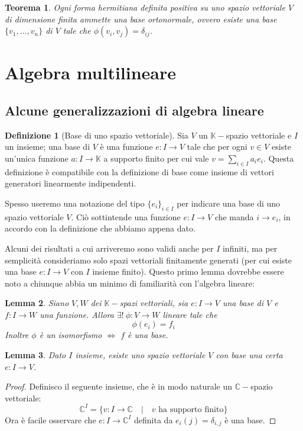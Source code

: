 \documentclass[11pt]{article}
\theoremstyle{plain}
\newtheorem{thm}{Teorema}[section]
\newtheorem{lemma}[thm]{Lemma}
\theoremstyle{definition}
\newtheorem{defn}{Definizione}[section]
\theoremstyle{remark}
\newcommand{\C}{\mathbb{C}}
\newcommand{\K}{\mathbb{K}}
\begin{document}
\begin{thm}
	Ogni forma hermitiana definita positiva su uno spazio vettoriale $V$ di dimensione finita ammette una \textit{base ortonormale}, ovvero esiste una base $\{v_1,\ldots,v_n\}$ di $V$ tale che $\phi(v_i,v_j)=\delta_{ij}$. 
\end{thm}




\newpage
\section{Algebra multilineare}
\subsection{Alcune generalizzazioni di algebra lineare}

\begin{defn}[Base di uno spazio vettoriale]
Sia $V$ un $\K-$spazio vettoriale e $I$ un insieme; una base di $V$ è una funzione $e: I \to V$ tale che 
per ogni $v \in V$ esiste un'unica funzione $a: I \to \K$ a supporto finito per cui vale $v=\sum_{i\in I}a_i e_i$.
Questa definizione è compatibile con la definizione di base come insieme di vettori generatori linearmente indipendenti.

Spesso useremo una notazione del tipo $\{e_i\}_{i\in I}$ per indicare una base di uno spazio vettoriale $V$. Ciò sottintende
una funzione $e:I\to V$ che manda $i\to e_i$, in accordo con la definizione che abbiamo appena dato.
\end{defn}

Alcuni dei risultati a cui arriveremo sono validi anche per $I$ infiniti, ma per semplicità consideriamo solo
spazi vettoriali finitamente generati (per cui esiste una base $e: I \to V$ con $I$ insieme finito).
Questo primo lemma dovrebbe essere noto a chiunque abbia un minimo di familiarità con l'algebra lineare:
\begin{lemma}
Siano $V,W$ dei $\K-$spazi vettoriali, sia $e:I\to V$ una base di $V$ e $f: I \to W$ una funzione. Allora $\exists!\  \phi: V \to W$ lineare tale che
\[\phi(e_i) = f_i \]
Inoltre $\phi$ è un isomorfismo $\Leftrightarrow$ $f$ è una base.
\end{lemma}

\begin{lemma}
Dato $I$ insieme, esiste uno spazio vettoriale $V$ con base una certa $e:I\to V$.
\end{lemma}
\begin{proof}
Definisco il seguente insieme, che è in modo naturale un $\C-$spazio vettoriale:
\[ \C^I = \{ v:I\to\C \quad|\quad v \text{ ha supporto finito}\}\]
Ora è facile osservare che $e:I\to\C^I$ definita da $e_i(j) = \delta_{i,j}$ è una base.
\end{proof}
\end{document}
